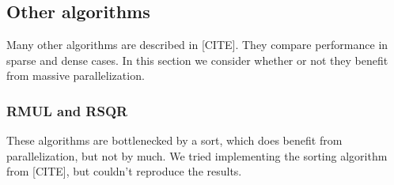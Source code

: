 







\subsection{Other algorithms}
Many other algorithms are described in [CITE]. They compare performance in sparse and dense cases. In this section we consider whether or not they benefit from massive parallelization.

\subsubsection{RMUL and RSQR}
These algorithms are bottlenecked by a sort, which does benefit from parallelization, but not by much. We tried implementing the sorting algorithm from [CITE], but couldn't reproduce the results.

